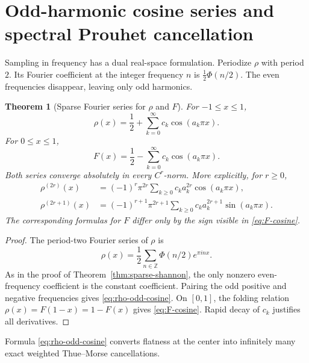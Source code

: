 \documentclass[11pt]{article}
\newtheorem{theorem}{Theorem}[section]
\theoremstyle{definition}
\theoremstyle{remark}
\begin{document}
\section{Odd-harmonic cosine series and spectral Prouhet cancellation}
\label{sec:cosine-p-series}

Sampling in frequency has a dual real-space formulation.  Periodize \(\rho\) with period
\(2\).  Its Fourier coefficient at the integer frequency \(n\) is
\(\frac12\Phi(n/2)\).  The even frequencies disappear, leaving only odd harmonics.

\begin{theorem}[Sparse Fourier series for \(\rho\) and \(F\)]
\label{thm:sparse-cosine}
For \(-1\le x\le1\),
\begin{equation}
\boxed{
 \rho(x)=\frac12+\sum_{k=0}^{\infty}c_k\cos(a_k\pi x).}    \label{eq:rho-odd-cosine}
\end{equation}
For \(0\le x\le1\),
\begin{equation}
\boxed{
 F(x)=\frac12-\sum_{k=0}^{\infty}c_k\cos(a_k\pi x).}      \label{eq:F-cosine}
\end{equation}
Both series converge absolutely in every \(C^r\)-norm.  More explicitly, for
\(r\ge0\),
\begin{align}
 \rho^{(2r)}(x)
 &=(-1)^r\pi^{2r}\sum_{k\ge0}c_ka_k^{2r}\cos(a_k\pi x),  \label{eq:rho-even-der}\\
 \rho^{(2r+1)}(x)
 &=(-1)^{r+1}\pi^{2r+1}\sum_{k\ge0}c_ka_k^{2r+1}
    \sin(a_k\pi x).                                      \label{eq:rho-odd-der}
\end{align}
The corresponding formulas for \(F\) differ only by the sign visible in
\eqref{eq:F-cosine}.
\end{theorem}

\begin{proof}
The period-two Fourier series of \(\rho\) is
\[
 \rho(x)=\frac12\sum_{n\in\mathbb Z}\Phi(n/2)e^{\pi i n x}.
\]
As in the proof of Theorem~\ref{thm:sparse-shannon}, the only nonzero even-frequency
coefficient is the constant coefficient.  Pairing the odd positive and negative
frequencies gives \eqref{eq:rho-odd-cosine}.  On \([0,1]\), the folding relation
\(\rho(x)=F(1-x)=1-F(x)\) gives \eqref{eq:F-cosine}.  Rapid decay of \(c_k\) justifies
all derivatives.
\end{proof}

Formula \eqref{eq:rho-odd-cosine} converts flatness at the center into infinitely many exact
weighted Thue--Morse cancellations.
\end{document}
